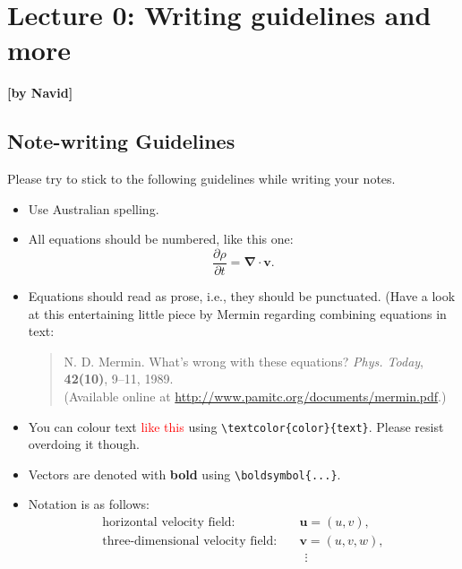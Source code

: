 
\section*{Lecture 0: Writing guidelines and more}
\begin{flushright}\textbf{[by Navid]}\end{flushright}


\subsection*{Note-writing Guidelines}


Please try to stick to the following guidelines while writing your notes.

\begin{itemize}

\item 
Use Australian spelling.

\item
All equations should be numbered, like this one:
\begin{equation}
  \frac{\partial\rho}{\partial t} = \boldsymbol{\nabla}\cdot\boldsymbol{v}.
\end{equation}

\item
Equations should read as prose, i.e., they should be punctuated. (Have a look at this entertaining little piece by Mermin regarding combining equations in text:
\begin{quote}
  N. D. Mermin. What's wrong with these equations? \emph{Phys. Today}, \textbf{42(10)}, 9–11, 1989.\\(Available online at \href{http://www.pamitc.org/documents/mermin.pdf}{http://www.pamitc.org/documents/mermin.pdf}.)
\end{quote}

\item
You can colour text \textcolor{red}{like this} using \verb"\textcolor{color}{text}". Please resist overdoing it though.

\item
Vectors are denoted with \textbf{bold} using \verb"\boldsymbol{...}".

\item
Notation is as follows:
\begin{align}
 \text{horizontal velocity field:}\quad &\boldsymbol{u} = (u, v), \\
 \text{three-dimensional velocity field:}\quad &\boldsymbol{v} = (u, v, w),\\
 &\ \ \vdots \nonumber
\end{align}


\end{itemize}
